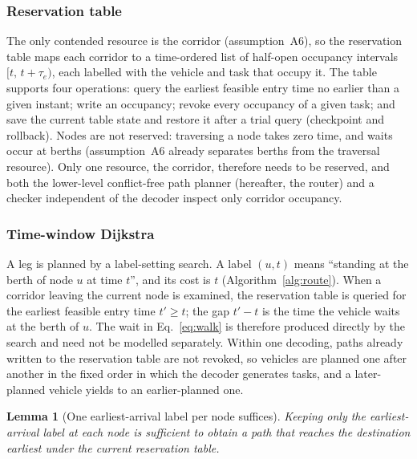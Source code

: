 \documentclass[manuscript,screen,review]{acmart}
\newtheorem{lem}{Lemma}
\begin{document}
\subsubsection{Reservation table}
The only contended resource is the corridor (assumption~A6), so the reservation table maps each corridor to a time-ordered list of half-open occupancy intervals $[t,\,t+\tau_e)$, each labelled with the vehicle and task that occupy it.
The table supports four operations: query the earliest feasible entry time no earlier than a given instant; write an occupancy; revoke every occupancy of a given task; and save the current table state and restore it after a trial query (checkpoint and rollback).
Nodes are not reserved: traversing a node takes zero time, and waits occur at berths (assumption~A6 already separates berths from the traversal resource).
Only one resource, the corridor, therefore needs to be reserved, and both the lower-level conflict-free path planner (hereafter, the router) and a checker independent of the decoder inspect only corridor occupancy.

\subsubsection{Time-window Dijkstra}
A leg is planned by a label-setting search. A label $(u,t)$ means ``standing at the berth of node $u$ at time $t$'', and its cost is $t$ (Algorithm~\ref{alg:route}).
When a corridor leaving the current node is examined, the reservation table is queried for the earliest feasible entry time $t'\ge t$; the gap $t'-t$ is the time the vehicle waits at the berth of $u$.
The wait in Eq.~\eqref{eq:walk} is therefore produced directly by the search and need not be modelled separately.
Within one decoding, paths already written to the reservation table are not revoked, so vehicles are planned one after another in the fixed order in which the decoder generates tasks, and a later-planned vehicle yields to an earlier-planned one.

\begin{lem}[One earliest-arrival label per node suffices]
\label{lem:label}
Keeping only the earliest-arrival label at each node is sufficient to obtain a path that reaches the destination earliest under the current reservation table.
\end{lem}
\end{document}

